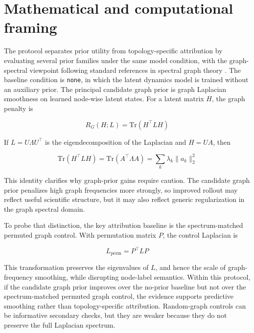 \documentclass[preprint,12pt]{elsarticle}
\begin{document}
\section{Mathematical and computational framing}

The protocol separates prior utility from topology-specific attribution by evaluating several prior families under the same model condition, with the graph-spectral viewpoint following standard references in spectral graph theory \citep{chung1997spectral}. The baseline condition is \texttt{none}, in which the latent dynamics model is trained without an auxiliary prior. The principal candidate graph prior is graph Laplacian smoothness on learned node-wise latent states. For a latent matrix $H$, the graph penalty is

\begin{equation}
R_G(H;L)=\mathrm{Tr}(H^\top L H)
\end{equation}

If $L = U \Lambda U^\top$ is the eigendecomposition of the Laplacian and $H = U A$, then

\begin{equation}
\mathrm{Tr}(H^\top L H)=\mathrm{Tr}(A^\top \Lambda A)=\sum_k \lambda_k \lVert a_k \rVert_2^2
\end{equation}

This identity clarifies why graph-prior gains require caution. The candidate graph prior penalizes high graph frequencies more strongly, so improved rollout may reflect useful scientific structure, but it may also reflect generic regularization in the graph spectral domain.

To probe that distinction, the key attribution baseline is the spectrum-matched permuted graph control. With permutation matrix $P$, the control Laplacian is

\begin{equation}
L_{\mathrm{perm}}=P^\top L P
\end{equation}

This transformation preserves the eigenvalues of $L$, and hence the scale of graph-frequency smoothing, while disrupting node-label semantics. Within this protocol, if the candidate graph prior improves over the no-prior baseline but not over the spectrum-matched permuted graph control, the evidence supports predictive smoothing rather than topology-specific attribution. Random-graph controls can be informative secondary checks, but they are weaker because they do not preserve the full Laplacian spectrum.
\end{document}
